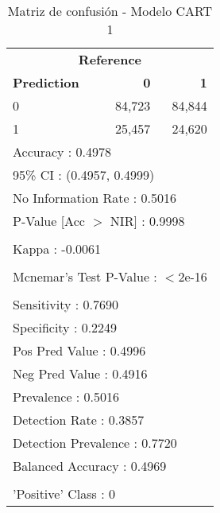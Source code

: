 \begin{table}[htbp]
\centering
\caption{Matriz de confusión - Modelo CART 1}
\label{tab:10_matriz_1_cart}
\begin{tabular}{lrr}
\toprule
\multicolumn{3}{c}{\textbf{Reference}} \\
\textbf{Prediction} & \textbf{0} & \textbf{1} \\
\midrule
0 & 84,723 & 84,844 \\
1 & 25,457 & 24,620 \\
\midrule
\multicolumn{3}{l}{Accuracy : 0.4978} \\
\multicolumn{3}{l}{95\% CI : (0.4957, 0.4999)} \\
\multicolumn{3}{l}{No Information Rate : 0.5016} \\
\multicolumn{3}{l}{P-Value [Acc $>$ NIR] : 0.9998} \\
\\
\multicolumn{3}{l}{Kappa : -0.0061} \\
\\
\multicolumn{3}{l}{Mcnemar's Test P-Value : $<$2e-16} \\
\\
\multicolumn{3}{l}{Sensitivity : 0.7690} \\
\multicolumn{3}{l}{Specificity : 0.2249} \\
\multicolumn{3}{l}{Pos Pred Value : 0.4996} \\
\multicolumn{3}{l}{Neg Pred Value : 0.4916} \\
\multicolumn{3}{l}{Prevalence : 0.5016} \\
\multicolumn{3}{l}{Detection Rate : 0.3857} \\
\multicolumn{3}{l}{Detection Prevalence : 0.7720} \\
\multicolumn{3}{l}{Balanced Accuracy : 0.4969} \\
\\
\multicolumn{3}{l}{'Positive' Class : 0} \\
\bottomrule
\end{tabular}
\end{table}